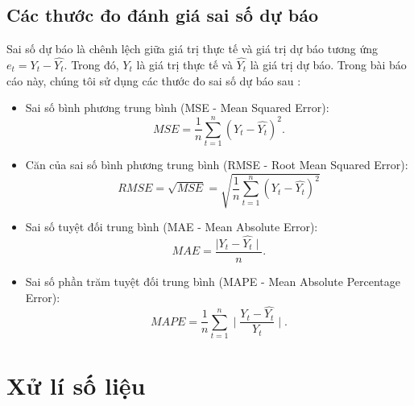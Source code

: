 \documentclass[12pt, a4paper,oneside]{book}
\theoremstyle{definition}
\begin{document}
\section{\label{TĐSS}Các thước đo đánh giá sai số dự báo}
Sai số dự báo là chênh lệch giữa giá trị thực tế và giá trị dự báo tương ứng $e_t = Y_t - \hat{Y_t}$. Trong đó, $Y_t$ là giá trị thực tế và $\hat{Y_t}$ là giá trị dự báo. Trong bài báo cáo này, chúng tôi sử dụng các thước đo sai số dự báo sau \cite{10, 11}:
\begin{itemize}
\item Sai số bình phương trung bình (MSE - Mean Squared Error): 
$$MSE=\frac{1}{n}\sum_{t=1}^{n}(Y_t-\hat{Y_t})^2.$$

\item Căn của sai số bình phương trung bình (RMSE - Root Mean Squared Error):
$$RMSE=\sqrt{MSE}=\sqrt{\frac{1}{n}\sum_{t=1}^{n}(Y_t-\hat{Y_t})^2}  $$

\item Sai số  tuyệt đối trung bình  (MAE - Mean Absolute Error): 
$$ MAE=\dfrac{\mid Y_t-\hat{Y_t}\mid}{n}.$$

\item Sai số phần trăm tuyệt đối trung bình (MAPE - Mean Absolute Percentage Error): 
$$MAPE=\frac{1}{n}\sum_{t=1}^{n}\mid\dfrac{ Y_t-\hat{Y_t}}{Y_t}\mid.$$
\end{itemize}
\chapter{Xử lí số liệu}
\label{xlsl}
\end{document}
